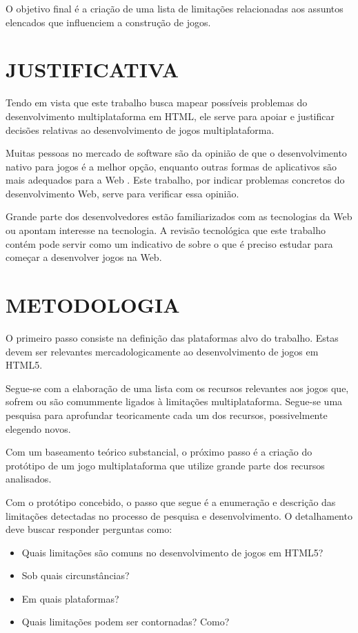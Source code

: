 O objetivo final é a criação de uma lista de limitações relacionadas
aos assuntos elencados que influenciem a construção de jogos.

\section{JUSTIFICATIVA}

Tendo em vista que este trabalho busca mapear possíveis problemas
do desenvolvimento multiplataforma em HTML, ele serve para apoiar
e justificar decisões relativas ao desenvolvimento de jogos
multiplataforma.

Muitas pessoas no mercado de software são da opinião de que o
desenvolvimento nativo para jogos é a melhor opção, enquanto outras
formas de aplicativos são mais adequados para a Web \citet[p.
21]{aSeriousContender}. Este trabalho, por indicar problemas concretos
do desenvolvimento Web, serve para verificar essa opinião.

Grande parte dos desenvolvedores estão familiarizados com as
tecnologias da Web ou apontam interesse na tecnologia. A revisão
tecnológica que este trabalho contém pode servir como um indicativo
de sobre o que é preciso estudar para começar a desenvolver jogos na
Web.

\section{METODOLOGIA}
\thispagestyle{myheadings}

O primeiro passo consiste na definição das plataformas alvo do trabalho.
Estas devem ser relevantes mercadologicamente ao desenvolvimento de
jogos em HTML5.

Segue-se com a elaboração de uma lista com os recursos relevantes
aos jogos que, sofrem ou são comummente ligados à
limitações multiplataforma. Segue-se uma pesquisa para aprofundar
teoricamente cada um dos recursos, possivelmente elegendo novos.

Com um baseamento teórico substancial, o próximo passo é a criação
do protótipo de um jogo multiplataforma que utilize grande parte dos
recursos analisados.

Com o protótipo concebido, o passo que segue é a enumeração e
descrição das limitações detectadas no processo de pesquisa e
desenvolvimento. O detalhamento deve buscar responder perguntas como:

\begin{itemize}
\item Quais limitações são comuns no desenvolvimento de jogos em HTML5?
\item Sob quais circunstâncias?
\item Em quais plataformas?
\item Quais limitações podem ser contornadas? Como?
\end{itemize}

